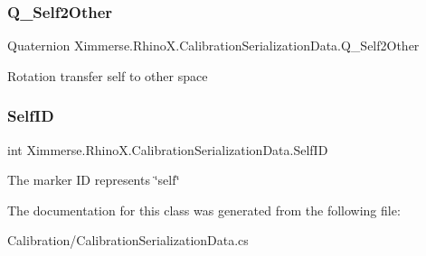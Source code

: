\subsubsection{\texorpdfstring{Q\+\_\+\+Self2\+Other}{Q\_Self2Other}}
{\footnotesize\ttfamily Quaternion Ximmerse.\+Rhino\+X.\+Calibration\+Serialization\+Data.\+Q\+\_\+\+Self2\+Other}



Rotation transfer self to other space 

\mbox{\label{class_ximmerse_1_1_rhino_x_1_1_calibration_serialization_data_a40dcec53e2ae1967cf4ef5aedff63c92}} 
\subsubsection{\texorpdfstring{Self\+ID}{SelfID}}
{\footnotesize\ttfamily int Ximmerse.\+Rhino\+X.\+Calibration\+Serialization\+Data.\+Self\+ID}



The marker ID represents \char`\"{}self\char`\"{} 



The documentation for this class was generated from the following file\+:\begin{DoxyCompactItemize}
\item 
Calibration/Calibration\+Serialization\+Data.\+cs\end{DoxyCompactItemize}
